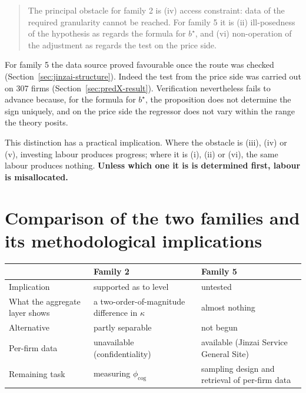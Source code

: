 \begin{quote}
The principal obstacle for family 2 is (iv) access constraint: data of the required granularity
cannot be reached. For family 5 it is (ii) ill-posedness of the hypothesis as regards the formula
for $b^\star$, and (vi) non-operation of the adjustment as regards the test on the price side.
\end{quote}

For family 5 the data source proved favourable once the route was checked
(Section~\ref{sec:jinzai-structure}). Indeed the test from the price side was carried out on 307
firms (Section~\ref{sec:predX-result}). Verification nevertheless fails to advance because, for
the formula for $b^\star$, the proposition does not determine the sign uniquely, and on the price
side the regressor does not vary within the range the theory posits.

This distinction has a practical implication. Where the obstacle is (iii), (iv) or (v), investing
labour produces progress; where it is (i), (ii) or (vi), the same labour produces nothing.
\textbf{Unless which one it is is determined first, labour is misallocated.}


\section{Comparison of the two families and its methodological implications}

\begin{center}
\begin{tabularx}{\textwidth}{@{}lXX@{}}
\toprule
 & Family 2 & Family 5 \\
\midrule
Implication & supported as to level & untested \\
What the aggregate layer shows & a two-order-of-magnitude difference in $\kappa$ & almost nothing \\
Alternative & partly separable & not begun \\
Per-firm data & unavailable (confidentiality) & available (Jinzai Service General Site) \\
Remaining task & measuring $\phi_{\mathrm{cog}}$ & sampling design and retrieval of per-firm data \\
\bottomrule
\end{tabularx}
\label{tab:family2-5-comparison}
\end{center}

